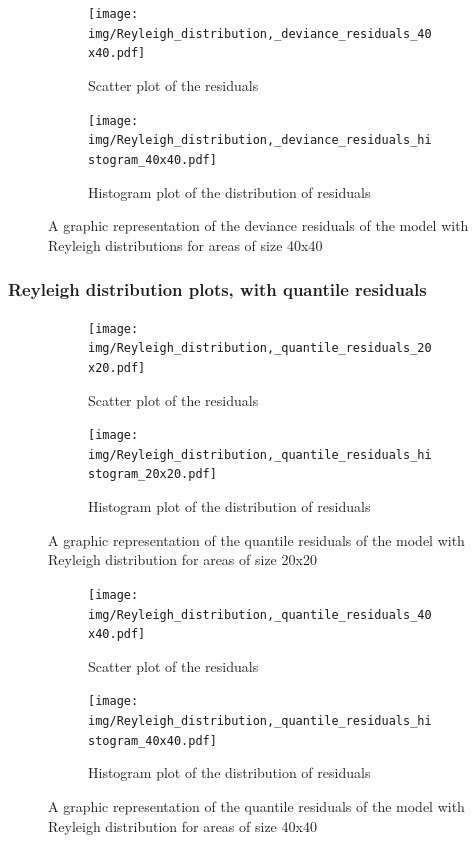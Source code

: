 \documentclass[12pt,a4paper,twoside]{article}
\begin{document}
\begin{figure}[!ht]
    \begin{subfigure}{.45\textwidth}
        \centering
        \texttt{[image: img/Reyleigh\_distribution,\_deviance\_residuals\_40x40.pdf]}
        \caption{Scatter plot of the residuals}
        \label{fig:reyleighdeviancescatter40}
    \end{subfigure}
    \begin{subfigure}{.45\textwidth}
        \centering
        \texttt{[image: img/Reyleigh\_distribution,\_deviance\_residuals\_histogram\_40x40.pdf]}
        \caption{Histogram plot of the distribution of residuals}
        \label{fig:reyleighdeviancehist40}
    \end{subfigure}
    \caption{A graphic representation of the deviance residuals of the model with Reyleigh
        distributions for areas of size 40x40}
    \label{fig:reyleighdeviancefig40}
\end{figure}

\newpage

\subsubsection{Reyleigh distribution plots, with quantile residuals}
\label{sssec:reyleighquantile}
\begin{figure}[!ht]
    \begin{subfigure}{.45\textwidth}
        \centering
        \texttt{[image: img/Reyleigh\_distribution,\_quantile\_residuals\_20x20.pdf]}
        \caption{Scatter plot of the residuals}
        \label{fig:reyleighquantilescatter20}
    \end{subfigure}
    \begin{subfigure}{.45\textwidth}
        \centering
        \texttt{[image: img/Reyleigh\_distribution,\_quantile\_residuals\_histogram\_20x20.pdf]}
        \caption{Histogram plot of the distribution of residuals}
        \label{fig:reyleighquantilehist20}
    \end{subfigure}
    \caption{A graphic representation of the quantile residuals of the model with Reyleigh
        distribution for areas of size 20x20}
    \label{fig:reyleighquantilefig20}
\end{figure}

\begin{figure}[!ht]
    \begin{subfigure}{.45\textwidth}
        \centering
        \texttt{[image: img/Reyleigh\_distribution,\_quantile\_residuals\_40x40.pdf]}
        \caption{Scatter plot of the residuals}
        \label{fig:reyleighquantilescatter40}
    \end{subfigure}
    \begin{subfigure}{.45\textwidth}
        \centering
        \texttt{[image: img/Reyleigh\_distribution,\_quantile\_residuals\_histogram\_40x40.pdf]}
        \caption{Histogram plot of the distribution of residuals}
        \label{fig:reyleighquantilehist40}
    \end{subfigure}
    \caption{A graphic representation of the quantile residuals of the model with Reyleigh
        distribution for areas of size 40x40}
    \label{fig:reyleighquantilefig40}
\end{figure}
\end{document}
